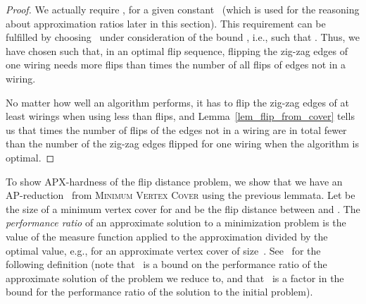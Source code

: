 \documentclass[11pt,a4paper]{article}
\begin{document}
\begin{proof}
We actually require , for a given constant~ (which is used for the reasoning about approximation ratios later in this section).
This requirement can be fulfilled by choosing~ under consideration of the bound , i.e., such that .
Thus, we have chosen  such that, in an optimal flip sequence, flipping the zig-zag edges of one wiring needs more flips than  times the number of all flips of edges not in a wiring.

No matter how well an algorithm performs, it has to flip the zig-zag edges of at least  wirings when using less than  flips, and Lemma~\ref{lem_flip_from_cover} tells us that  times the number of flips of the edges not in a wiring are in total fewer than the number of the zig-zag edges flipped for one wiring when the algorithm is optimal.
\end{proof}




To show APX-hardness of the flip distance problem, we show that we have an AP-reduction~\cite[pp.~256--261]{apx_book} from \textsc{Minimum Vertex Cover} using the previous lemmata.
Let  be the size of a minimum vertex cover for  and  be the flip distance between  and .
The \emph{performance ratio} of an approximate solution to a minimization problem is the value of the measure function applied to the approximation divided by the optimal value, e.g.,  for an approximate vertex cover of size~.
See~\cite[pp.~257--258]{apx_book} for the following definition (note that~ is a bound on the performance ratio of the approximate solution of the problem we reduce to, and that~ is a factor in the bound for the performance ratio of the solution to the initial problem).
\end{document}
